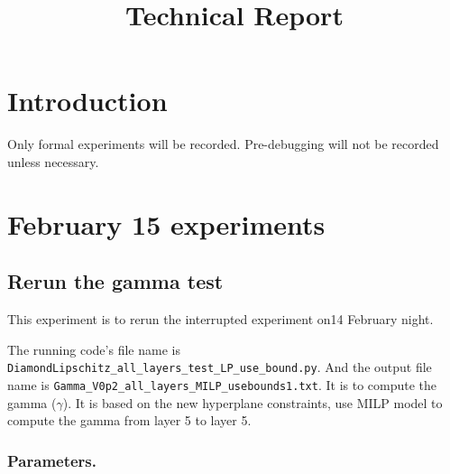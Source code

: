 \documentclass{llncs}
\title{Technical Report}
\date{}
\begin{document}
	
\maketitle

\section*{Introduction}

Only formal experiments will be recorded. Pre-debugging will not be recorded unless necessary.

\section{February 15 experiments}

\subsection{Rerun the gamma test}

This experiment is to rerun the interrupted experiment on14 February night.

\vspace*{1ex}

The running code's file name is \verb*|DiamondLipschitz_all_layers_test_LP_use_bound.py|. And the output file name is \verb*|Gamma_V0p2_all_layers_MILP_usebounds1.txt|. It is to compute the gamma ($\gamma$). It is based on the new hyperplane constraints, use MILP model to compute the gamma from layer 5 to layer 5.


\subsubsection*{Parameters.}
\end{document}
